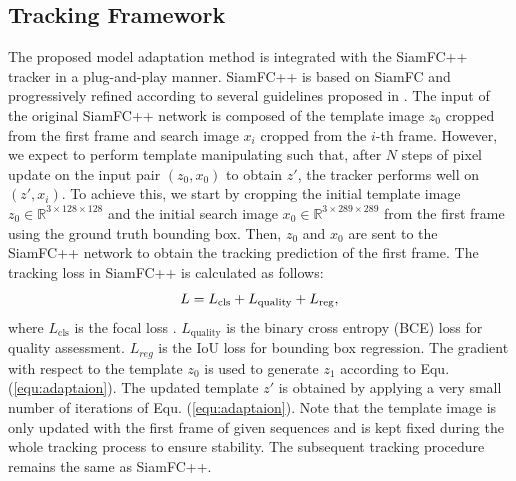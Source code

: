 \documentclass[journal]{IEEEtran}
\begin{document}
\subsection{Tracking Framework}
The proposed model adaptation method is integrated with the SiamFC++ tracker \cite{SiamFC++} in a plug-and-play manner. SiamFC++ is based on SiamFC \cite{bertinetto2016fully} and progressively refined according to several guidelines proposed in \cite{SiamFC++}. The input of the original SiamFC++ network is composed of the template image $z_0$ cropped from the first frame and search image $x_i$ cropped from the $i$-th frame. However, we expect to perform template manipulating such that, after $N$ steps of pixel update on the input pair $(z_0, x_0)$ to obtain $z'$, the tracker performs well on $(z', x_i)$. To achieve this, we start by cropping the initial template image $z_0\in\mathbb R^{3\times128\times 128}$ and the initial search image $x_0\in\mathbb R^{3\times289\times 289}$ from the first frame using the ground truth bounding box.
Then, $z_0$ and $x_0$ are sent to the SiamFC++ network to obtain the tracking prediction of the first frame. The tracking loss in SiamFC++ \cite{SiamFC++} is calculated as follows:
\vspace{-0.1cm}
\begin{equation}
    L = L_{\text{cls}} + L_{\text{quality}} + L_{\text{reg}},
    \vspace{-0.1cm}
\end{equation}
where $L_{\text{cls}}$ is the focal loss \cite{lin2017focal}. $L_{\text{quality}}$ is the binary cross entropy (BCE) loss for quality assessment. $L_{reg}$ is the IoU loss \cite{yu2016unitbox} for bounding box regression. The gradient with respect to the template $z_0$ is used to generate $z_1$ according to Equ. (\ref{equ:adaptaion}). The updated template $z'$ is obtained by applying a very small number of iterations of Equ. (\ref{equ:adaptaion}). Note that the template image is only updated with the first frame of given sequences and is kept fixed during the whole tracking process to ensure stability.
The subsequent tracking procedure remains the same as SiamFC++.
\end{document}
